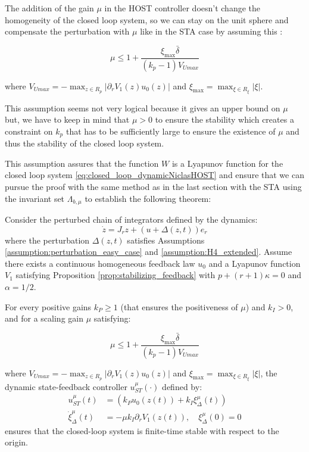 The addition of the gain \(\mu\) in the HOST controller doesn't change the homogeneity of the closed loop system, so
we can stay on the unit sphere and compensate the perturbation with \(\mu\) like in the STA case by assuming this :

\begin{equation}
    \mu \leq 1 + \frac{\xi_{\max} \bar{\delta}}{(k_p - 1) V_{Umax}}
\end{equation}

where \(V_{Umax} = - \max_{z \in R_p} |\partial_r V_1(z) u_0(z)|\) and \(\xi_{\max} = \max_{\xi \in R_\xi} |\xi|\).

This assumption seems not very logical because it gives an upper bound on \(\mu\) but, we have to keep in mind
that \(\mu > 0\) to ensure the stability which creates a constraint on \(k_p\) that has to be sufficiently large to
ensure the existence of \(\mu\) and thus the stability of the closed loop system.

This assumption assures that the function \(W\) is a Lyapunov function for the closed loop system 
\ref{eq:closed_loop_dynamicNiclasHOST} and ensure that we can pursue the proof with the same method as in the 
last section with the STA using the invariant set \(\Lambda_{b, \mu}\) to establish the following theorem:

\begin{theorem}
    Consider the perturbed chain of integrators defined by the dynamics:
    \begin{equation}
    \dot{z} = J_r z + (u + \Delta(z, t)) e_r
    \end{equation}
    where the perturbation \(\Delta(z, t)\) satisfies Assumptions \ref{assumption:perturbation_easy_case} and \ref{assumption:H4_extended}. Assume there exists a continuous homogeneous feedback law \(u_0\) and a Lyapunov function \(V_1\) satisfying Proposition \ref{prop:stabilizing_feedback} with \(p + (r+1)\kappa = 0\) and \(\alpha = 1/2\).

    For every positive gains \(k_P \geq 1\) (that ensures the positiveness of \(\mu\)) 
    and \(k_I > 0\), and for a scaling gain \(\mu\) satisfying:

    \begin{equation}
        \mu \leq 1 + \frac{\xi_{\max} \bar{\delta}}{(k_p - 1) V_{Umax}}
    \end{equation}

    where \(V_{Umax} = - \max_{z \in R_p} |\partial_r V_1(z) u_0(z)|\) and \(\xi_{\max} = \max_{\xi \in R_\xi} |\xi|\), the dynamic state-feedback controller \(u_{ST}^{\mu}(\cdot)\) defined by:
    \begin{align}
        u_{ST}^{\mu}(t) &= \left(k_P u_0(z(t)) + k_I \xi^{\mu}_{\Delta}(t)\right) \\
        \dot{\xi}^{\mu}_{\Delta}(t) &= -\mu k_I \partial_r V_1(z(t)), \quad \xi^{\mu}_{\Delta}(0) = 0
    \end{align}
    ensures that the closed-loop system is finite-time stable with respect to the origin. 

\end{theorem}


